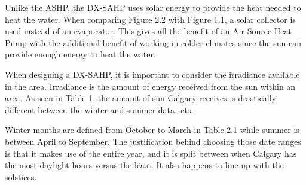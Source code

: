 \smallskip
Unlike the ASHP, the DX-SAHP uses solar energy to provide the heat needed to heat the water. When comparing Figure 2.2 with Figure 1.1, a solar collector is used instead of an evaporator. This gives all the benefit of an Air Source Heat Pump with the additional benefit of working in colder climates since the sun can provide enough energy to heat the water.

\medskip
When designing a DX-SAHP, it is important to consider the irradiance available in the area. Irradiance is the amount of energy received from the sun within an area. As seen in Table 1, the amount of sun Calgary receives is drastically different between the winter and summer data sets.

\medskip
Winter months are defined from October to March in Table 2.1 while summer is between April to September. The justification behind choosing those date ranges is that it makes use of the entire year, and it is split between when Calgary has the most daylight hours versus the least. It also happens to line up with the solstices.

\medskip

